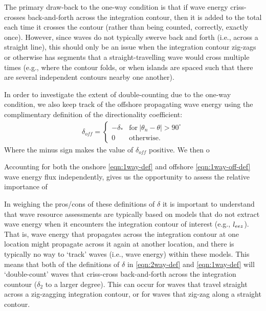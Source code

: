 The primary draw-back to the one-way condition is that if wave energy criss-crosses back-and-forth across the integration contour, then it is added to the total each time it crosses the contour (rather than being counted, correctly, exactly once). However, since waves do not typically swerve back and forth (i.e., across a straight line), this should only be an issue when the integration contour zig-zags or otherwise has segments that a straight-travelling wave would cross multiple times (e.g., where the contour folds, or when islands are spaced such that there are several independent contours nearby one another).

In order to investigate the extent of double-counting due to the one-way condition, we also keep track of the offshore propagating wave energy using the complimentary definition of the directionality coefficient:
\begin{align}
  \label{eqn:1way-off-def}
    \delta_{off} = 
    \begin{cases}
     -\delta_* & \mathrm{for\ }|\theta_n - \theta|>90^\circ \\
    0 & \mathrm{otherwise}.
    \end{cases}
\end{align}
Where the minus sign makes the value of $\delta_{off}$ positive. We then o

Accounting for both the onshore \eqref{eqn:1way-def} and offshore \eqref{eqn:1way-off-def} wave energy flux independently, gives us the opportunity to assess the relative importance of 

In weighing the pros/cons of these definitions of $\delta$ it is important to understand that wave resource assessments are typically based on models that do not extract wave energy when it encounters the integration contour of interest (e.g., $l_{eez}$). That is, wave energy that propagates across the integration contour at one location might propagate across it again at another location, and there is typically no way to `track' waves (i.e., wave energy) within these models.
This means that both of the definitions of $\delta$ in \eqref{eqn:2way-def} and \eqref{eqn:1way-def} will `double-count' waves that criss-cross back-and-forth across the integration countour ($\delta_2$ to a larger degree). This can occur for waves that travel straight across a zig-zagging integration contour, or for waves that zig-zag along a straight contour. 


